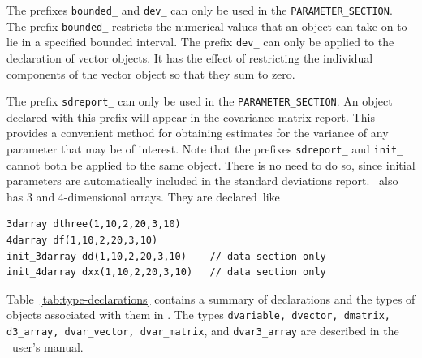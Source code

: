 \documentclass{admbmanual}
\newcommand\PS{\texttt{PARAMETER\_SECTION}}
\begin{document}
The prefixes \texttt{bounded\_} and \texttt{dev\_} can only be used in the \PS.
The prefix \texttt{bounded\_} restricts the numerical values that an object can
take on to lie in a specified bounded interval. The prefix \texttt{dev\_} can
only be applied to the declaration of vector objects. It has the effect of
restricting the individual components of the vector object so that they sum to
zero.

The prefix \texttt{sdreport\_} can only be used in the \PS. An object declared
with this prefix will appear in the covariance matrix report. This provides a
convenient method for obtaining estimates for the variance of any parameter that
may be of interest. Note that the prefixes \texttt{sdreport\_} and
\texttt{init\_} cannot both be applied to the same object. There is no need to
do so, since initial parameters are automatically included in the standard
deviations report. \ADM\ also has 3 and 4-dimensional arrays. They are
declared~like
\begin{lstlisting}
3darray dthree(1,10,2,20,3,10)
4darray df(1,10,2,20,3,10)
init_3darray dd(1,10,2,20,3,10)    // data section only
init_4darray dxx(1,10,2,20,3,10)   // data section only
\end{lstlisting}
Table~\ref{tab:type-declarations} contains a summary of declarations and the
types of objects associated with them in \ADM. The types
\texttt{dvariable, dvector, dmatrix, d3\_array, dvar\_vector, dvar\_matrix}, and
\texttt{dvar3\_array} are described in the \scAD\ user's manual.

\end{document}
